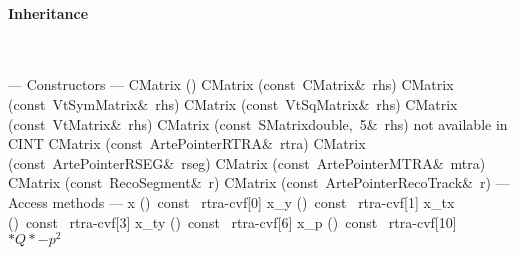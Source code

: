 \documentclass{article}
\begin{document}
\begin{cxxentry}
\begin{cxxclass}
\begin{cxxInheritance}
\paragraph{Inheritance}\strut\smallskip\strut\\
\end{cxxInheritance}
\begin{cxxpublic}
\cxxitem{}
        {--- Constructors --- }
        {}
        {}
        {}
\label{cxx.2.6.1}
\cxxitem{}
        {CMatrix}
        {()}
        {}
        {}
\label{cxx.2.6.2}
\cxxitem{}
        {CMatrix}
        {(const\ CMatrix\&\ rhs)}
        {}
        {}
\label{cxx.2.6.3}
\cxxitem{}
        {CMatrix}
        {(const\ VtSymMatrix\&\ rhs)}
        {}
        {}
\label{cxx.2.6.4}
\cxxitem{}
        {CMatrix}
        {(const\ VtSqMatrix\&\ rhs)}
        {}
        {}
\label{cxx.2.6.5}
\cxxitem{}
        {CMatrix}
        {(const\ VtMatrix\&\ rhs)}
        {}
        {}
\label{cxx.2.6.6}
\cxxitem{}
        {CMatrix}
        {(const\ SMatrix\<double,\ 5\>\&\ rhs)}
        { not available in CINT}
        {}
\label{cxx.2.6.7}
\cxxitem{}
        {CMatrix}
        {(const\ ArtePointer\<RTRA\>\&\ rtra)}
        {}
        {}
\label{cxx.2.6.8}
\cxxitem{}
        {CMatrix}
        {(const\ ArtePointer\<RSEG\>\&\ rseg)}
        {}
        {}
\label{cxx.2.6.9}
\cxxitem{}
        {CMatrix}
        {(const\ ArtePointer\<MTRA\>\&\ mtra)}
        {}
        {}
\label{cxx.2.6.10}
\cxxitem{}
        {CMatrix}
        {(const\ RecoSegment\&\ r)}
        {}
        {}
\label{cxx.2.6.11}
\cxxitem{}
        {CMatrix}
        {(const\ ArtePointer\<RecoTrack\>\&\ r)}
        {}
        {}
\label{cxx.2.6.12}
\cxxitem{}
        {--- Access methods --- }
        {}
        {}
        {}
\label{cxx.2.6.13}
        {x}
        {()\ const\ }
        { rtra-\>cvf[0]}
        {}
\label{cxx.2.6.14}
        {x\_y}
        {()\ const\ }
        { rtra-\>cvf[1]}
        {}
\label{cxx.2.6.15}
        {x\_tx}
        {()\ const\ }
        { rtra-\>cvf[3]}
        {}
\label{cxx.2.6.16}
        {x\_ty}
        {()\ const\ }
        { rtra-\>cvf[6]}
        {}
\label{cxx.2.6.17}
        {x\_p}
        {()\ const\ }
        { rtra-\>cvf[10] $* Q * -p^2$}
        {}

\end{cxxpublic}
\end{cxxclass}
\end{cxxentry}
\end{document}
